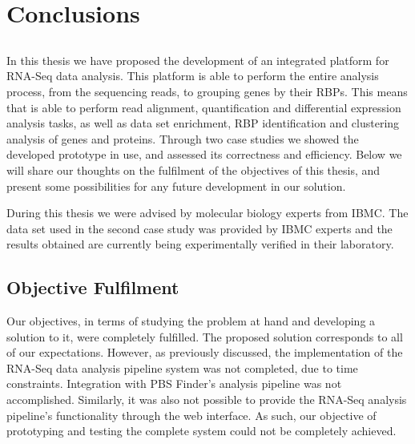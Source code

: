 \chapter{Conclusions} \label{chap:conclusions}

\section*{}


In this thesis we have proposed the development of an integrated platform for
RNA-Seq data analysis. This platform is able to perform the entire analysis
process, from the sequencing reads, to grouping genes by their RBPs. This means
that is able to perform read alignment, quantification and differential
expression analysis tasks, as well as data set enrichment, RBP identification
and clustering analysis of genes and proteins. Through two case studies we
showed the developed prototype in use, and assessed its correctness and
efficiency. Below we will share our thoughts on the fulfilment of the objectives
of this thesis, and present some possibilities for any future development in our
solution.

During this thesis we were advised by molecular biology experts from IBMC. The
data set used in the second case study was provided by IBMC experts and the
results obtained are currently being experimentally verified in their
laboratory.

\section{Objective Fulfilment}

Our objectives, in terms of studying the problem at hand and developing a
solution to it, were completely fulfilled. The proposed solution corresponds to
all of our expectations. However, as previously discussed, the implementation of
the RNA-Seq data analysis pipeline system was not completed, due to time
constraints. Integration with PBS Finder's analysis pipeline was not
accomplished. Similarly, it was also not possible to provide the RNA-Seq
analysis pipeline's functionality through the web interface. As such, our
objective of prototyping and testing the complete system could not be completely
achieved.

